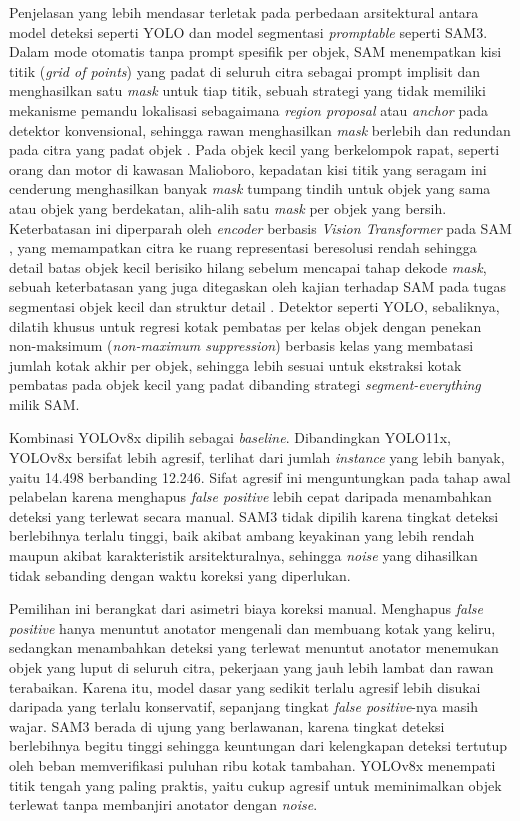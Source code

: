 Penjelasan yang lebih mendasar terletak pada perbedaan arsitektural antara model deteksi 
seperti YOLO dan model segmentasi \textit{promptable} seperti SAM3. Dalam mode otomatis 
tanpa prompt spesifik per objek, SAM menempatkan kisi titik (\textit{grid of points}) 
yang padat di seluruh citra sebagai prompt implisit dan menghasilkan satu \textit{mask} 
untuk tiap titik, sebuah strategi yang tidak memiliki mekanisme pemandu lokalisasi 
sebagaimana \textit{region proposal} atau \textit{anchor} pada detektor konvensional, 
sehingga rawan menghasilkan \textit{mask} berlebih dan redundan pada citra yang padat 
objek \cite{gao2026pmgsam}. Pada objek kecil yang berkelompok rapat, seperti orang 
dan motor di kawasan Malioboro, kepadatan kisi titik yang seragam ini cenderung 
menghasilkan banyak \textit{mask} tumpang tindih untuk objek yang sama atau objek yang 
berdekatan, alih-alih satu \textit{mask} per objek yang bersih. Keterbatasan ini diperparah 
oleh \textit{encoder} berbasis \textit{Vision Transformer} pada SAM \cite{kirillov2023segment}, 
yang memampatkan citra ke ruang representasi beresolusi rendah sehingga detail batas objek 
kecil berisiko hilang sebelum mencapai tahap dekode \textit{mask}, sebuah keterbatasan yang 
juga ditegaskan oleh kajian terhadap SAM pada tugas segmentasi objek kecil dan struktur 
detail \cite{yu2025granular}. Detektor seperti 
YOLO, sebaliknya, dilatih khusus untuk regresi kotak pembatas per kelas objek dengan 
penekan non-maksimum (\textit{non-maximum suppression}) berbasis kelas yang membatasi 
jumlah kotak akhir per objek, sehingga lebih sesuai untuk ekstraksi kotak pembatas pada 
objek kecil yang padat dibanding strategi \textit{segment-everything} milik SAM.

Kombinasi YOLOv8x dipilih sebagai \textit{baseline}. Dibandingkan YOLO11x, YOLOv8x 
bersifat lebih agresif, terlihat dari jumlah \textit{instance} yang lebih banyak, yaitu 
14.498 berbanding 12.246. Sifat agresif ini menguntungkan pada tahap awal pelabelan karena 
menghapus \textit{false positive} lebih cepat daripada menambahkan deteksi yang terlewat 
secara manual. SAM3 tidak dipilih karena tingkat deteksi berlebihnya terlalu tinggi, baik 
akibat ambang keyakinan yang lebih rendah maupun akibat karakteristik arsitekturalnya, 
sehingga \textit{noise} yang dihasilkan tidak sebanding dengan waktu koreksi yang 
diperlukan.

Pemilihan ini berangkat dari asimetri biaya koreksi manual. Menghapus \textit{false 
positive} hanya menuntut anotator mengenali dan membuang kotak yang keliru, sedangkan 
menambahkan deteksi yang terlewat menuntut anotator menemukan objek yang luput di seluruh 
citra, pekerjaan yang jauh lebih lambat dan rawan terabaikan. Karena itu, model dasar yang 
sedikit terlalu agresif lebih disukai daripada yang terlalu konservatif, sepanjang tingkat 
\textit{false positive}-nya masih wajar. SAM3 berada di ujung yang berlawanan, karena 
tingkat deteksi berlebihnya begitu tinggi sehingga keuntungan dari kelengkapan deteksi 
tertutup oleh beban memverifikasi puluhan ribu kotak tambahan. YOLOv8x menempati titik 
tengah yang paling praktis, yaitu cukup agresif untuk meminimalkan objek terlewat tanpa 
membanjiri anotator dengan \textit{noise}.

